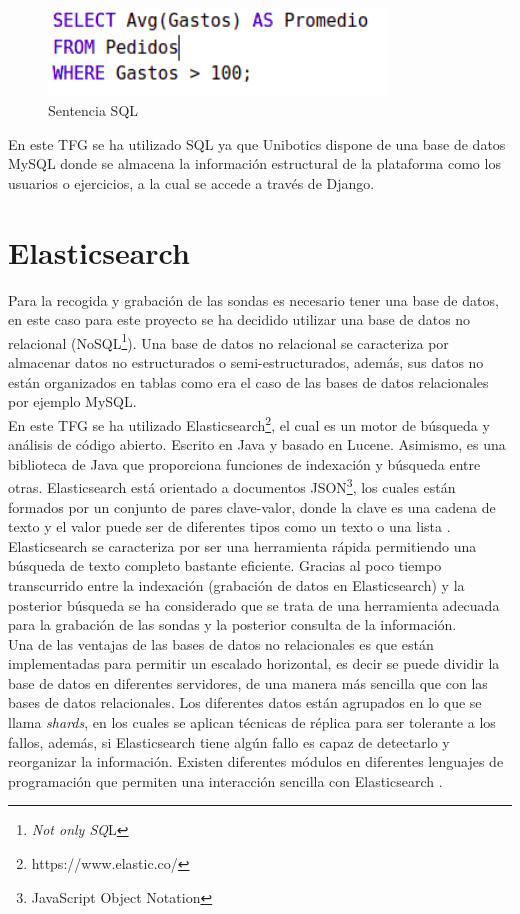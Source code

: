 \begin{figure}[H]
    \centering
    \includegraphics[width=9cm, keepaspectratio]{img/ejsql.png}
    \caption{Sentencia SQL}
    \label{fig:ejsql}
\end{figure}
En este TFG se ha utilizado SQL ya que Unibotics dispone de una base de datos MySQL donde se almacena la información estructural de la plataforma como los usuarios o ejercicios, a la cual se accede a través de Django.

\section{Elasticsearch}
Para la recogida y grabación de las sondas es necesario tener una base de datos, en este caso para este proyecto se ha decidido utilizar una base de datos no relacional (NoSQL\footnote{\textit{Not only SQ}L}). Una base de datos no relacional se caracteriza por almacenar datos no estructurados o semi-estructurados, además, sus datos no están organizados en tablas como era el caso de las bases de datos relacionales por ejemplo MySQL.\\

En este TFG se ha utilizado Elasticsearch\footnote{https://www.elastic.co/}, el cual es un motor de búsqueda y análisis de código abierto. Escrito en Java y basado en Lucene. Asimismo, es una biblioteca de Java que proporciona funciones de indexación y búsqueda entre otras. Elasticsearch está orientado a documentos JSON\footnote{JavaScript Object Notation}, los cuales están formados por un conjunto de pares clave-valor, donde la clave es una cadena de texto y el valor puede ser de diferentes tipos como un texto o una lista \cite{elastic}.\\

Elasticsearch se caracteriza por ser una herramienta rápida permitiendo una búsqueda de texto completo bastante eficiente. Gracias al poco tiempo transcurrido entre la indexación (grabación de datos en Elasticsearch) y la posterior búsqueda se ha considerado que se trata de una herramienta adecuada para la grabación de las sondas y la posterior consulta de la información.\\

Una de las ventajas de las bases de datos no relacionales es que están implementadas para permitir un escalado horizontal, es decir se puede dividir la base de datos en diferentes servidores, de una manera más sencilla que con las bases de datos relacionales. Los diferentes datos están agrupados en lo que se llama \textit{shards}, en los cuales se aplican técnicas de réplica para ser tolerante a los fallos, además, si Elasticsearch tiene algún fallo es capaz de detectarlo y reorganizar la información. Existen diferentes módulos en diferentes lenguajes de programación que permiten una interacción sencilla con Elasticsearch \cite{elastic2}.\\

